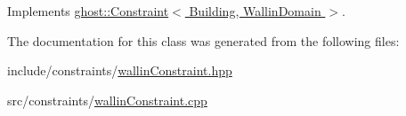Implements \hyperlink{classghost_1_1Constraint_ac67f7952cdf7212327b7db506225d12c}{ghost\-::\-Constraint$<$ Building, Wallin\-Domain $>$}.



The documentation for this class was generated from the following files\-:\begin{DoxyCompactItemize}
\item 
include/constraints/\hyperlink{wallinConstraint_8hpp}{wallin\-Constraint.\-hpp}\item 
src/constraints/\hyperlink{wallinConstraint_8cpp}{wallin\-Constraint.\-cpp}\end{DoxyCompactItemize}
